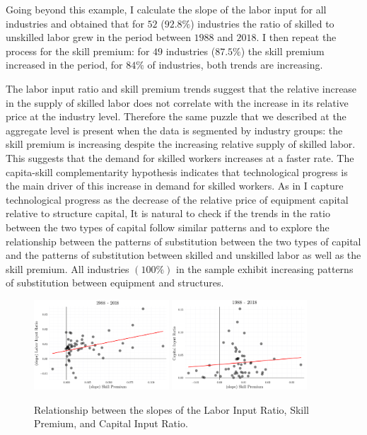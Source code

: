\documentclass[12pt]{article}
\begin{document}
Going beyond this example, I calculate the slope of the labor input for all industries and obtained that for $52$ ($92.8\%$) industries the ratio of skilled to unskilled labor grew in the period between $1988$ and $2018$. I then repeat the process for the skill premium: for $49$ industries ($87.5\%$) the skill premium increased in the period, for $84\%$ of industries, both trends are increasing.

The labor input ratio and skill premium trends suggest that the relative increase in the supply of skilled labor does not correlate with the increase in its relative price at the industry level. Therefore the same puzzle that we described at the aggregate level is present when the data is segmented by industry groups: the skill premium is increasing despite the increasing relative supply of skilled labor. This suggests that the demand for skilled workers increases at a faster rate. The capita-skill complementarity hypothesis indicates that technological progress is the main driver of this increase in demand for skilled workers. As in \citet{krusell2000capital} I capture technological progress as the decrease of the relative price of equipment capital relative to structure capital, It is natural to check if the trends in the ratio between the two types of capital follow similar patterns and to explore the relationship between the patterns of substitution between the two types of capital and the patterns of substitution between skilled and unskilled labor as well as the skill premium. All industries $(100\%)$ in the sample exhibit increasing patterns of substitution between equipment and structures.

\begin{figure}[H]
 \centering
 \includegraphics[width=0.45\textwidth]{../images/trend_correlation_doc.pdf}
 \hfill
 \includegraphics[width=0.45\textwidth]{../images/trend_correlation_2_doc.pdf}
 \caption{\label{fig:trends_correlation} Relationship between the slopes of the Labor Input Ratio, Skill Premium, and Capital Input Ratio.}
\end{figure}
\end{document}
